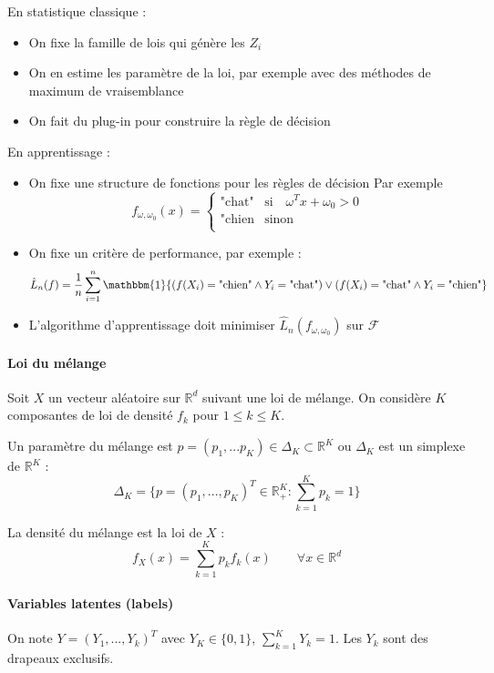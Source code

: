 \documentclass{article}
\begin{document}
En statistique classique :
\begin{itemize}
\item On fixe la famille de lois qui génère les $Z_i$
\item On en estime les paramètre de la loi, par exemple avec des méthodes de maximum de vraisemblance
\item On fait du plug-in pour construire la règle de décision
\end{itemize}
\bigskip

En apprentissage :
\begin{itemize}
\item On fixe une structure de fonctions pour les règles de décision
Par exemple
\[f_{\omega, \omega_0} (x) = 
\begin{cases}
\text{"chat"} & \text{si} \quad \omega^T x + \omega_0 > 0\\
\text{"chien} & \text{sinon}\\
\end{cases}\]
\item On fixe un critère de performance, par exemple :
\[\hat{L}_n (f)= \dfrac{1}{n}\sum_{i=1}^{n} \mathbbm{1} \{ (f(X_i) = \text{"chien"} \land Y_i=\text{"chat"}) \lor (f(X_i)=\text{"chat"} \land Y_i=\text{"chien"} \} \]
\item L'algorithme d'apprentissage doit minimiser $\hat{L}_n (f_{\omega,\omega_0})$ sur $\mathcal{F}$
\end{itemize}

\paragraph{Loi du mélange}
Soit $X$ un vecteur aléatoire sur $\mathbb{R}^d$ suivant une loi de mélange. On considère $K$ composantes de loi de densité $f_k$ pour $1\leq k \leq K$.

Un paramètre du mélange est $p=(p_1, ... p_K) \in \Delta_K \subset \mathbb{R}^K$ ou $\Delta_K$ est un simplexe de $\mathbb{R}^K$ :
\[\Delta_K = \big\{ p = (p_1,...,p_K)^T \in \mathbb{R}^K_+ : \sum_{k=1}^K p_k = 1 \big\}\]

La densité du mélange est la loi de $X$ :
\[ f_X(x) = \sum_{k=1}^K p_kf_k(x) \qquad \forall x\in \mathbb{R}^d\]


\paragraph{Variables latentes (labels)}
On note $Y = (Y_1, ..., Y_k)^T$ avec $Y_K \in \{0,1\}$, $\sum_{k=1}^K Y_k = 1$.
Les $Y_k$ sont des drapeaux exclusifs.
\end{document}
